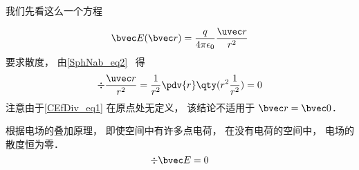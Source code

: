 

我们先看这么一个方程

\begin{equation}\label{CEfDiv_eq1}
\bvec E(\bvec r) = \frac{q}{4\pi\epsilon_0}\frac{\uvec r}{r^2}
\end{equation}
要求散度， 由\autoref{SphNab_eq2}~ 得
\begin{equation}
\div \frac{\uvec r}{r^2} = \frac{1}{r^2} \pdv{r} \qty(r^2 \frac{1}{r^2}) = 0
\end{equation}
注意由于\autoref{CEfDiv_eq1} 在原点处无定义， 该结论不适用于 $\bvec r = \bvec 0$．

根据电场的叠加原理， 即使空间中有许多点电荷， 在没有电荷的空间中， 电场的散度恒为零．
\begin{equation}
\div \bvec E = 0
\end{equation}
